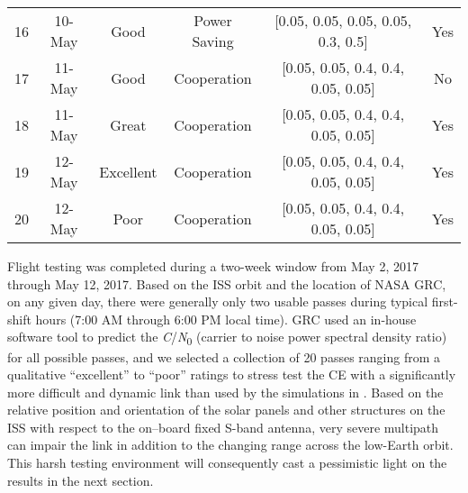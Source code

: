 \documentclass[journal]{IEEEtran}
\begin{document}
\begin{table*}[t]
\begin{center}
\begin{tabular}{cc|cccc}
		16 &	10-May	&	Good  		&	Power Saving 		 	 &	[0.05, 0.05, 0.05,  0.05,  0.3,   0.5] 	&	Yes \\
		17 &	11-May	&	Good  		&	Cooperation 	 		 &	[0.05, 0.05, 0.4,   0.4,   0.05,  0.05] 	&	No \\
		18 &	11-May	&	Great   	&	Cooperation 	 		 &	[0.05, 0.05, 0.4,   0.4,   0.05,  0.05] 	&	Yes \\
		19 &	12-May	&	Excellent   &	Cooperation 	 		 &	[0.05, 0.05, 0.4,   0.4,   0.05,  0.05] 	&	Yes \\
		20 & 	12-May 	&	Poor		&	Cooperation 	 		 &	[0.05, 0.05, 0.4,   0.4,   0.05,  0.05] 	&	Yes \\

		\hline
   \end{tabular}
 \end{center}
\end{table*}

Flight testing was completed during a two-week window from May 2, 2017 through May 12, 2017.  Based on the ISS orbit and the location of NASA GRC, on any given day, there were generally only two usable passes during typical first-shift hours (7:00 AM through 6:00 PM local time).  GRC used an in-house software tool to predict the \textit{C}/\textit{N}\textsubscript{0} (carrier to noise power spectral density ratio) for all possible passes, and we selected a collection of 20 passes ranging from a qualitative ``excellent'' to ``poor'' ratings to stress test the CE with a significantly more difficult and dynamic link than used by the simulations in \cite{paulo-jrnl}.  Based on the relative position and orientation of the solar panels and other structures on the ISS with respect to the on--board fixed S-band antenna, very severe multipath can impair the link in addition to the changing range across the low-Earth orbit.  This harsh testing environment will consequently cast a pessimistic light on the results in the next section.
\end{document}
